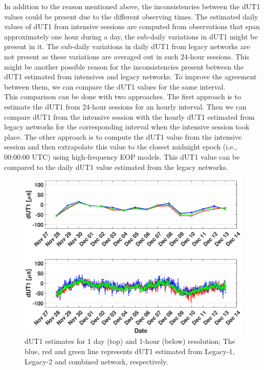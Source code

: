 \documentclass[smallextended]{svjour3}       %
\begin{document}
In addition to the reason mentioned above, the inconsistencies between the dUT1 values could be present due to the different observing times. The estimated daily values of dUT1 from intensive sessions are computed from observations that span approximately one hour during a day, the sub-daily variations in dUT1 might be present in it. The sub-daily variations in daily dUT1 from legacy networks are not present as these variations are averaged out in such 24-hour sessions. This might be another possible reason for the inconsistencies present between the dUT1 estimated from intensives and legacy networks. To improve the agreement between them, we can compare the dUT1 values for the same interval. \\ 
This comparison can be done with two approaches. The first approach is to estimate the dUT1 from 24-hour sessions for an hourly interval. Then we can compare dUT1 from the intensive session with the hourly dUT1 estimated from legacy networks for the corresponding interval when the intensive session took place. The other approach is to compute the dUT1 value from the intensive session and then extrapolate this value to the closest midnight epoch (i.e., 00:00:00 UTC) using high-frequency EOP models. This dUT1 value can be compared to the daily dUT1 value estimated from the legacy networks. \\

\begin{figure}
    \centering
    \includegraphics[scale=0.3]{dut1.eps}
    \caption{dUT1 estimates for 1 day (top) and 1-hour (below) resolution; The blue, red and green line represents dUT1 estimated from Legacy-1, Legacy-2 and combined network, respectively.}
    \label{fig:dut1}
\end{figure}
\end{document}
